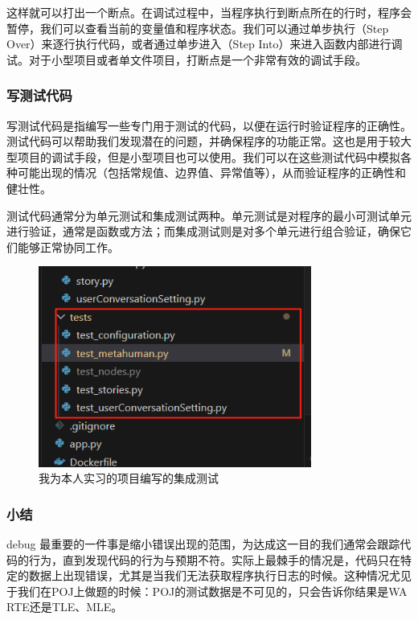 \documentclass[../main.tex]{subfiles}
\begin{document}
这样就可以打出一个断点。在调试过程中，当程序执行到断点所在的行时，程序会暂停，我们可以查看当前的变量值和程序状态。我们可以通过单步执行（Step Over）来逐行执行代码，或者通过单步进入（Step Into）来进入函数内部进行调试。对于小型项目或者单文件项目，打断点是一个非常有效的调试手段。

\subsubsection{写测试代码}

写测试代码是指编写一些专门用于测试的代码，以便在运行时验证程序的正确性。测试代码可以帮助我们发现潜在的问题，并确保程序的功能正常。这也是用于较大型项目的调试手段，但是小型项目也可以使用。我们可以在这些测试代码中模拟各种可能出现的情况（包括常规值、边界值、异常值等），从而验证程序的正确性和健壮性。

测试代码通常分为单元测试和集成测试两种。单元测试是对程序的最小可测试单元进行验证，通常是函数或方法；而集成测试则是对多个单元进行组合验证，确保它们能够正常协同工作。

\begin{figure}[htbp]
\centering
\includegraphics[width=0.8\textwidth]{images/tests.png}
\caption{我为本人实习的项目编写的集成测试}
\end{figure}

\subsubsection{小结}

debug 最重要的一件事是缩小错误出现的范围，为达成这一目的我们通常会跟踪代码的行为，直到发现代码的行为与预期不符。实际上最棘手的情况是，代码只在特定的数据上出现错误，尤其是当我们无法获取程序执行日志的时候。这种情况尤见于我们在POJ上做题的时候：POJ的测试数据是不可见的，只会告诉你结果是WA RTE还是TLE、MLE。
\end{document}
